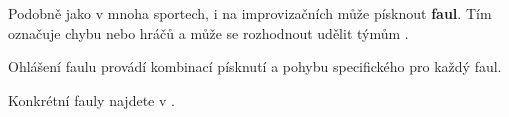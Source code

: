 \documentclass[main.tex]{subfiles}
\begin{document}
\needspace{5cm} \label{faul} Podobně jako v mnoha sportech, i na improvizačních  může  písknout \textbf{faul}{}. Tím označuje chybu  nebo hráčů a může se rozhodnout udělit týmům . 
 
Ohlášení faulu provádí  kombinací písknutí a pohybu specifického pro každý faul. 
 
Konkrétní fauly najdete v . 
 
 
\end{document}
